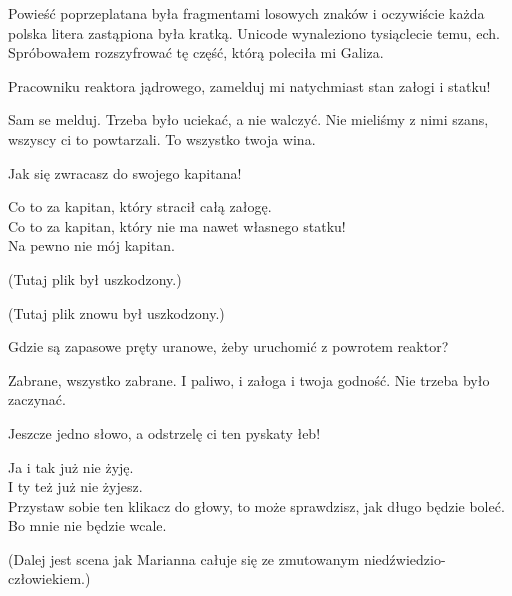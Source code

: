 Powieść poprzeplatana była fragmentami losowych znaków i oczywiście każda polska litera zastąpiona była kratką. 
Unicode wynaleziono tysiąclecie temu, ech.
Spróbowałem rozszyfrować tę część, którą poleciła mi Galiza.

\begin{poem}
	
	\charkap{}
	Pracowniku reaktora jądrowego, zamelduj mi natychmiast stan załogi i statku!
	
	\charkos{}
	Sam se melduj. Trzeba było uciekać, a nie walczyć.
	Nie mieliśmy z nimi szans, wszyscy ci to powtarzali.
	To wszystko twoja wina.
	
	\charkap{}
	Jak się zwracasz do swojego kapitana!
	
	\charkos{}
	Co to za kapitan, który stracił całą załogę. \\
	Co to za kapitan, który nie ma nawet własnego statku! \\
	Na pewno nie mój kapitan.
\end{poem}
	(Tutaj plik był uszkodzony.)
\begin{poem}
\end{poem}
	(Tutaj plik znowu był uszkodzony.)
\begin{poem}
	Gdzie są zapasowe pręty uranowe, żeby uruchomić z powrotem reaktor?
	
	\charkos{}
	Zabrane, wszystko zabrane.
	I paliwo, i załoga i twoja godność.
	Nie trzeba było zaczynać.
	
	\charkap{}
	Jeszcze jedno słowo, a odstrzelę ci ten pyskaty łeb!
	
	\charkos{}
	Ja i tak już nie żyję. \\
	I ty też już nie żyjesz. \\
	Przystaw sobie ten klikacz do głowy, to może sprawdzisz, jak długo będzie boleć. \\
	Bo mnie nie będzie wcale.
	
	
	(Dalej jest scena jak Marianna całuje się ze zmutowanym niedźwiedzio-człowiekiem.)
\end{poem}

